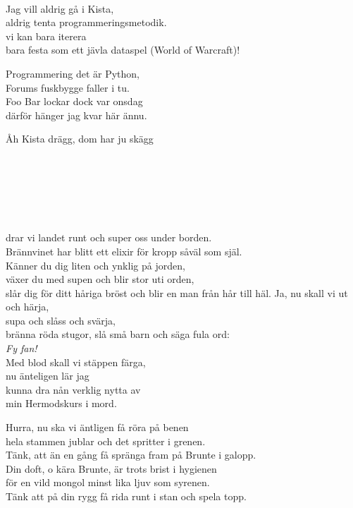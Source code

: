 {{\newpage
 \\       

\songtext{}
Jag vill aldrig gå i Kista,\\
aldrig tenta programmeringsmetodik.\\
vi kan bara iterera\\
bara festa som ett jävla dataspel (World of Warcraft)!

Programmering det är Python, \\
Forums fuskbygge faller i tu.\\
Foo Bar lockar dock var onsdag \\
därför hänger jag kvar här ännu.

\leftrepeat Åh Kista drägg, dom har ju skägg \rightrepeat

 \\\


 \\       
\author{Text: Hans Alfredson}

\\
drar vi landet runt och super oss under borden.\\
Brännvinet har blitt ett elixir för kropp såväl som själ.\\
Känner du dig liten och ynklig på jorden,\\
växer du med supen och blir stor uti orden,\\
slår dig för ditt håriga bröst och blir en man från hår till häl.
\newpage
Ja, nu skall vi ut och härja,\\
supa och slåss och svärja,\\
bränna röda stugor, slå små barn och säga fula ord:\\
\textit{Fy fan!}\\
Med blod skall vi stäppen färga,\\ 
nu änteligen lär jag\\ 
kunna dra nån verklig nytta av\\ 
min Hermodskurs i mord.

Hurra, nu ska vi äntligen få röra på benen\\
hela stammen jublar och det spritter i grenen.\\
Tänk, att än en gång få spränga fram på Brunte i galopp.\\
Din doft, o kära Brunte, är trots brist i hygienen\\
för en vild mongol minst lika ljuv som syrenen.\\
Tänk att på din rygg få rida runt i stan och spela topp.

}}

